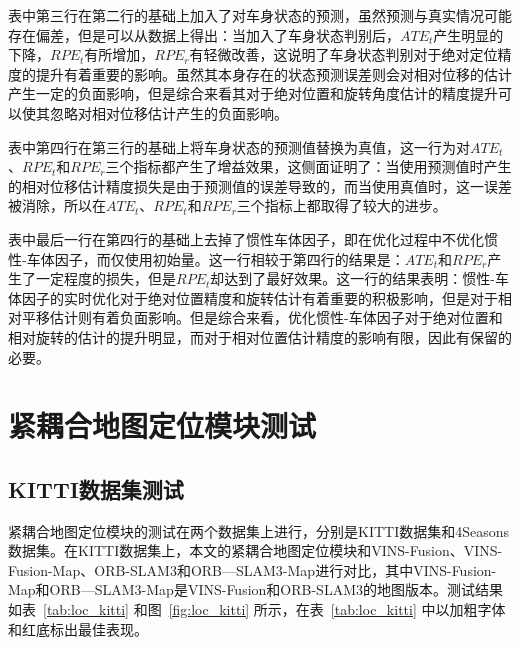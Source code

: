 表中第三行在第二行的基础上加入了对车身状态的预测，虽然预测与真实情况可能存在偏差，但是可以从数据上得出：当加入了车身状态判别后，$ATE_t$产生明显的下降，$RPE_t$有所增加，$RPE_r$有轻微改善，这说明了车身状态判别对于绝对定位精度的提升有着重要的影响。虽然其本身存在的状态预测误差则会对相对位移的估计产生一定的负面影响，但是综合来看其对于绝对位置和旋转角度估计的精度提升可以使其忽略对相对位移估计产生的负面影响。

表中第四行在第三行的基础上将车身状态的预测值替换为真值，这一行为对$ATE_t$、$RPE_t$和$RPE_r$三个指标都产生了增益效果，这侧面证明了：当使用预测值时产生的相对位移估计精度损失是由于预测值的误差导致的，而当使用真值时，这一误差被消除，所以在$ATE_t$、$RPE_t$和$RPE_r$三个指标上都取得了较大的进步。

表中最后一行在第四行的基础上去掉了惯性车体因子，即在优化过程中不优化惯性-车体因子，而仅使用初始量。这一行相较于第四行的结果是：$ATE_t$和$RPE_r$产生了一定程度的损失，但是$RPE_t$却达到了最好效果。这一行的结果表明：惯性-车体因子的实时优化对于绝对位置精度和旋转估计有着重要的积极影响，但是对于相对平移估计则有着负面影响。但是综合来看，优化惯性-车体因子对于绝对位置和相对旋转的估计的提升明显，而对于相对位置估计精度的影响有限，因此有保留的必要。

\section{紧耦合地图定位模块测试}
\subsection{KITTI数据集测试}
紧耦合地图定位模块的测试在两个数据集上进行，分别是KITTI数据集和4Seasons数据集。在KITTI数据集上，本文的紧耦合地图定位模块和VINS-Fusion、VINS-Fusion-Map、ORB-SLAM3和ORB—SLAM3-Map进行对比，其中VINS-Fusion-Map和ORB—SLAM3-Map是VINS-Fusion和ORB-SLAM3的地图版本。测试结果如表~\ref{tab:loc_kitti} 和图~\ref{fig:loc_kitti} 所示，在表~\ref{tab:loc_kitti} 中以加粗字体和红底标出最佳表现。

